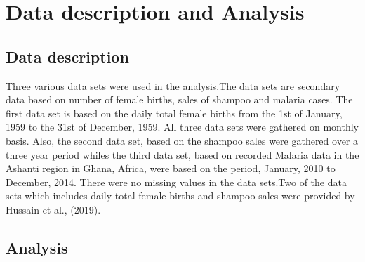 \documentclass[11]{article}
\begin{document}
\section{Data description and Analysis}
\subsection{Data description}
Three various data sets were used in the analysis.The data sets are secondary data based on number of female births, sales of shampoo and malaria cases. The first data set is based on the daily total female births from the 1st of January, 1959 to the 31st of December, 1959. All three data sets were gathered on monthly basis. Also, the second data set, based on the shampoo sales were gathered over a three year period whiles the third data set, based on recorded Malaria data in the Ashanti region in Ghana, Africa, were based on the period, January, 2010 to December, 2014. There were no missing values in the data sets.Two of the data sets which includes daily total female births and shampoo sales were provided by Hussain et al., (2019).
\subsection{Analysis}
\end{document}
